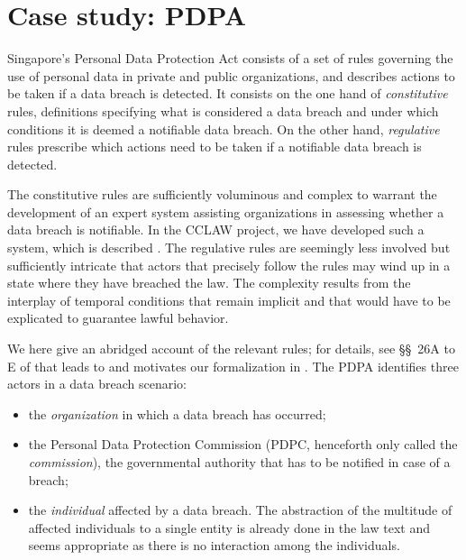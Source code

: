 \section{Case study: PDPA}\label{sec:case_study_pdpa}

Singapore's Personal Data Protection Act \cite{pdpa_link} consists of a set of
rules governing the use of personal data in private and public organizations,
and describes actions to be taken if a data breach is detected. It consists on
the one hand of \emph{constitutive} rules, \ie{} definitions specifying
what is considered a data breach and under which conditions it is deemed a
notifiable data breach. On the other hand, \emph{regulative} rules prescribe
which actions need to be taken if a notifiable data breach is detected.

The constitutive rules are sufficiently voluminous and complex to warrant the
development of an expert system assisting organizations in assessing whether a
data breach is notifiable. In the CCLAW project, we have developed such a
system, which is described . The regulative rules
are seemingly less involved but sufficiently intricate that actors that
precisely follow the rules may wind up in a state where they have breached the
law. The complexity results from the interplay of temporal conditions that
remain implicit and that would have to be explicated to guarantee lawful
behavior.

We here give an abridged account of the relevant rules; for details, see
\S\S~26A to E of \cite{pdpa_link} that leads to and motivates our
formalization in . The PDPA identifies three
actors in a data breach scenario:
\begin{itemize}
\item the \emph{organization} in which a data breach has occurred;
\item the Personal Data Protection Commission (PDPC, henceforth only called
  the \emph{commission}), the governmental authority that has to be notified
  in case of a breach;
\item the \emph{individual} affected by a data breach. The abstraction of the
  multitude of affected individuals to a single entity is already done in the
  law text and seems appropriate as there is no interaction among the
  individuals. 
\end{itemize}

